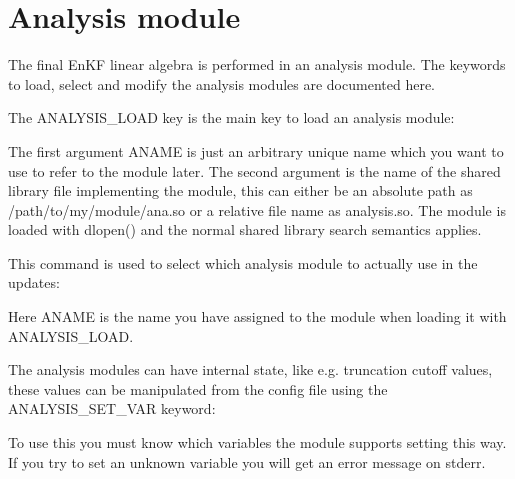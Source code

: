 \documentclass[a4paper,10pt,english]{sphinxmanual}
\begin{document}
\section{Analysis module}
\label{\detokenize{keywords/index:analysis-module}}\label{\detokenize{keywords/index:id10}}
The final EnKF linear algebra is performed in an analysis module. The keywords
to load, select and modify the analysis modules are documented here.

\label{\detokenize{keywords/index:analysis-load}}
\begin{sphinxShadowBox}

The ANALYSIS\_LOAD key is the main key to load an analysis module:

%
\begin{sphinxVerbatim}[commandchars=\\\{\}]
   
\end{sphinxVerbatim}

The first argument ANAME is just an arbitrary unique name which you want to
use to refer to the module later. The second argument is the name of the
shared library file implementing the module, this can either be an absolute
path as /path/to/my/module/ana.so or a relative file name as analysis.so. The
module is loaded with dlopen() and the normal shared library search semantics
applies.
\end{sphinxShadowBox}
\label{\detokenize{keywords/index:analysis-select}}
\begin{sphinxShadowBox}

This command is used to select which analysis module to actually use in the
updates:

%
\begin{sphinxVerbatim}[commandchars=\\\{\}]
 
\end{sphinxVerbatim}

Here ANAME is the name you have assigned to the module when loading it with
ANALYSIS\_LOAD.
\end{sphinxShadowBox}
\label{\detokenize{keywords/index:analysis-set-var}}
\begin{sphinxShadowBox}

The analysis modules can have internal state, like e.g. truncation cutoff
values, these values can be manipulated from the config file using the
ANALYSIS\_SET\_VAR keyword:

%
\begin{sphinxVerbatim}[commandchars=\\\{\}]
      
\end{sphinxVerbatim}

To use this you must know which variables the module supports setting this
way. If you try to set an unknown variable you will get an error message on
stderr.
\end{sphinxShadowBox}
\end{document}
